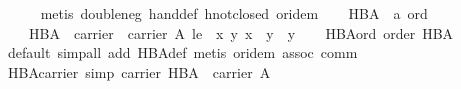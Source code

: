 \begin{isabellebody}
%
\isadelimproof
\ \ \ \ %
\endisadelimproof
%
\isatagproof
{}\isamarkupfalse%
\ {}metis\ double{}neg\ hand{}def\ hnot{}closed\ or{}idem{}%
\endisatagproof
{\isafoldproof}%
%
\isadelimproof
\isanewline
%
\endisadelimproof
\isanewline
\ \ \isamarkupfalse%
\ HBA\ {}{}\ {}{}a\ ord{}\ \isanewline
\ \ \ \ {}HBA\ {}\ {}carrier\ {}\ carrier\ A{}\ le\ {}\ {}{}x\ y{}\ x\ {}\ y\ {}\ y{}{}{}\isanewline
\isanewline
\ \ \isamarkupfalse%
\ HBA{}ord{}\ {}order\ HBA{}\isanewline
%
\isadelimproof
\ \ \ \ %
\endisadelimproof
%
\isatagproof
{}\isamarkupfalse%
\ {}default{}\ simp{}all\ add{}\ HBA{}def{}\ {}metis\ or{}idem\ assoc\ comm{}{}{}%
\endisatagproof
{\isafoldproof}%
%
\isadelimproof
\isanewline
%
\endisadelimproof
\isanewline
\ \ \isamarkupfalse%
\ HBA{}carrier\ {}simp{}{}\ {}carrier\ HBA\ {}\ carrier\ A{}\isanewline
%
\isadelimproof
\ \ \ \ %
\endisadelimproof
%
\isatagproof

\end{isabellebody}
